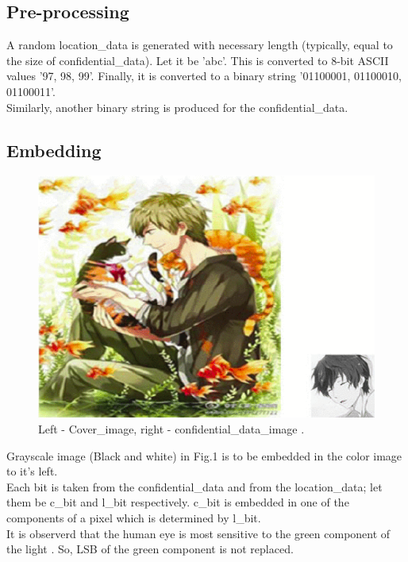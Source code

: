 \documentclass[conference]{IEEEtran}
\begin{document}
\subsection{Pre-processing}
A random location\_data is generated with necessary length (typically, equal to the size of confidential\_data). Let it be 'abc'.
This is converted to 8-bit ASCII values '97, 98, 99'.
Finally, it is converted to a binary string '01100001, 01100010, 01100011'.\\

Similarly, another binary string is produced for the confidential\_data.
\subsection{Embedding}

\begin{figure}[H]
  \includegraphics[width=\linewidth]{cover_image_cum_confidential_data.png}
  \caption{Left - Cover\_image, right - confidential\_data\_image \cite{b2}.}
\end{figure}

Grayscale image (Black and white) in Fig.1 is to be embedded in the color image to it's left.\\

Each bit is taken from the confidential\_data and from the location\_data;
let them be c\_bit and l\_bit respectively.
c\_bit is embedded in one of the components of a pixel which is determined by l\_bit.\\

It is observerd that the human eye is most sensitive to the green component of the light \cite{b2}.
So, LSB of the green component is not replaced.\\
\end{document}
